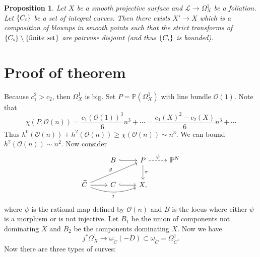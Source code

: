 \documentclass[leqno, openany]{memoir}
\newtheorem{prop}[thm]{Proposition}
\theoremstyle{definition}
\theoremstyle{remark}
\theoremstyle{plain}
\theoremstyle{definition}
\theoremstyle{remark}
\renewcommand{\P}{\mathbb{P}}
\newcommand{\mc}[1]{\mathcal{#1}}
\newcommand{\wt}[1]{\widetilde{#1}}
\begin{document}
\begin{prop}
    Let $X$ be a smooth projective surface and $\mc{L} \to \Omega^1_X$ be a foliation. Let $\qty{C_i}$ be a set of integral curves. Then there exists $X' \to X$ which is a composition of blowups in smooth points such that the strict transforms of $\qty{C_i} \setminus \qty{\text{finite set}}$ are pairwise disjoint (and thus $\qty{C_i}$ is bounded).
\end{prop}

\section{Proof of theorem}

Because $c_1^2 > c_2$, then $\Omega^1_X$ is big. Set $P = \P(\Omega^1_X)$ with line bundle $\mc{O}(1)$. Note that
\[ \chi(P, \mc{O}(n)) = \frac{c_1(\mc{O}(1))^3}{6} n^3 + \cdots = \frac{c_1(X)^2 - c_2(X)}{6} n^3 + \cdots \]
Thus $h^0(\mc{O}(n)) + h^2(\mc{O}(n)) \geq \chi(\mc{O}(n)) \sim n^3$. We can bound $h^2(\mc{O}(n)) \sim n^2$. Now consider
\begin{equation*}
\begin{tikzcd}
    & B \ar[hookrightarrow]{r} & P \ar{d}{\pi} \ar[dashrightarrow]{r}{\psi} & \P^N \\
    \wt{C} \ar{r} \ar{urr}{g} \ar[bend right=20, swap]{rr}{j} & C \ar[hookrightarrow]{r} & X,
\end{tikzcd}
\end{equation*}
where $\psi$ is the rational map defined by $\mc{O}(n)$ and $B$ is the locus where either $\psi$ is a morphism or is not injective. Let $B_1$ be the union of components not dominating $X$ and $B_2$ be the components dominating $X$. Now we have
\[ j^* \Omega^1_X \to \omega_{\wt{C}}(-D) \subset \omega_{\wt{C}} = \Omega^1_{\wt{C}}. \]
Now there are three types of curves:
\end{document}
